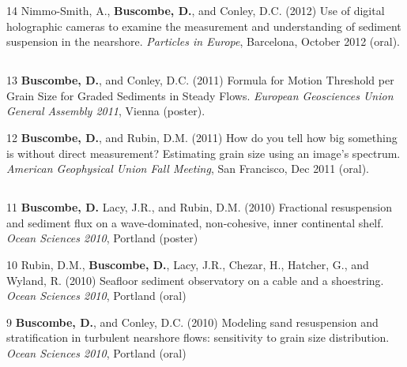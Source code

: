 \documentclass[margin,line]{resume}
\begin{document}
\begin{resume}
\begin{footnotesize}
\begin{list1}
	\item[14] Nimmo-Smith, A., {\bf Buscombe, D.}, and Conley, D.C. (2012) Use of digital holographic cameras to examine the measurement and understanding of sediment suspension in the nearshore. {\sl Particles in Europe}, Barcelona, October 2012 (oral).

	\end{list1}

	\subsection{}
	\begin{list1}
	\item[13] {\bf Buscombe, D.}, and Conley, D.C. (2011) Formula for Motion Threshold per Grain Size for Graded Sediments in Steady Flows. {\sl European Geosciences Union General Assembly 2011}, Vienna (poster).\\

        \item[12] {\bf Buscombe, D.}, and Rubin, D.M. (2011) How do you tell how big something is without direct measurement? Estimating grain size using an image’s spectrum. {\sl American Geophysical Union Fall Meeting}, San Francisco, Dec 2011 (oral).
	\end{list1}

	\subsection{}
	\begin{list1}
	\item[11] {\bf Buscombe, D.} Lacy, J.R., and Rubin, D.M. (2010) Fractional resuspension and sediment flux on a wave-dominated, non-cohesive, inner continental shelf. {\sl Ocean Sciences 2010}, Portland (poster)\\

	\item[10] Rubin, D.M., {\bf Buscombe, D.}, Lacy, J.R., Chezar, H., Hatcher, G., and Wyland, R. (2010) Seafloor sediment observatory on a cable and a shoestring. {\sl Ocean Sciences 2010}, Portland (oral)\\

	\item[9] {\bf Buscombe, D.}, and Conley, D.C. (2010) Modeling sand resuspension and stratification in turbulent nearshore flows: sensitivity to grain size distribution. {\sl Ocean Sciences 2010}, Portland (oral)\\


\end{list1}
\end{footnotesize}
\end{resume}
\end{document}

